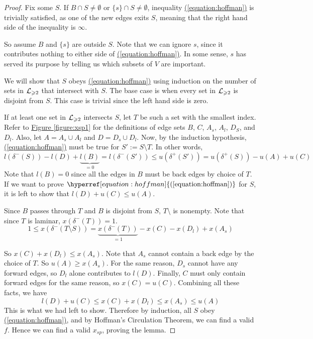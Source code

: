 \documentclass[./main.tex]{subfiles}
\begin{document}
\begin{proof}
			Fix some $S$. If $B\cap S\neq \emptyset$ or $\{s\}\cap S\neq \emptyset$, inequality \hyperref[equation:hoffman]{(\ref{equation:hoffman})} is trivially satisfied, as one of the new edges exits $S$, meaning that the right hand side of the inequality is $\infty$.

			So assume $B$ and $\{s\}$ are outside $S$. Note that we can ignore $s$, since it contributes nothing to either side of \hyperref[equation:hoffman]{(\ref{equation:hoffman})}. In some sense, $s$ has served its purpose by telling us which subsets of $V$ are important.

			We will show that $S$ obeys \hyperref[equation:hoffman]{(\ref{equation:hoffman})} using induction on the number of sets in $\mathcal{L}_{\geqslant 2}$ that intersect with $S$. The base case is when every set in $\mathcal{L}_{\geqslant 2}$ is disjoint from $S$. This case is trivial since the left hand side is zero.

			If at least one set in $\mathcal{L}_{\geqslant 2}$ intersects $S$, let $T$ be such a set with the smallest index. Refer to \hyperref[figure:xsp1]{Figure \ref{figure:xsp1}} for the definitions of edge sets $B$, $C$, $A_s$, $A_l$, $D_S$, and $D_l$. Also, let $A = A_s\cup A_l$ and $D = D_s\cup D_l$. Now, by the induction hypothesis, \hyperref[equation:hoffman]{(\ref{equation:hoffman})} must be true for $S':=S\setminus T$. In other words, \[ l(\delta^-(S)) - l(D) + \underbrace{l(B)}_{=0} = l(\delta^-(S'))\leq u(\delta^+(S')) = u(\delta^+(S)) - u(A) + u(C) \]
			Note that $l(B) = 0$ since all the edges in $B$ must be back edges by choice of $T$. If we want to prove $\hyperref[equation:hoffman]{(\ref{equation:hoffman})}$ for $S$, it is left to show that $l(D) + u(C)\leq u(A)$.

			Since $B$ passes through $T$ and $B$ is disjoint from $S$, $T\setminus$ is nonempty. Note that since $T$ is laminar, $x(\delta^-(T)) = 1$. \[ 1\leq x(\delta^-(T\setminus S))=\underbrace{x(\delta^-(T))}_{=1} - x(C) - x(D_l) + x(A_s) \]

			So $x(C) + x(D_l)\leq x(A_s)$. Note that $A_s$ cannot contain a back edge by the choice of $T$. So $u(A)\geq x(A_s)$. For the same reason, $D_s$ cannot have any forward edges, so $D_l$ alone contributes to $l(D)$. Finally, $C$ must only contain forward edges for the same reason, so $x(C) = u(C)$. Combining all these facts, we have \[l(D) + u(C)\leq x(C) + x(D_l)\leq x(A_s)\leq u(A)\]
			This is what we had left to show. Therefore by induction, all $S$ obey \hyperref[equation:hoffman]{(\ref{equation:hoffman})}, and by Hoffman's Circulation Theorem, we can find a valid $f$. Hence we can find a valid $x_{sp}$, proving the lemma.
	\end{proof}
	\vspace{5mm}
\end{document}
